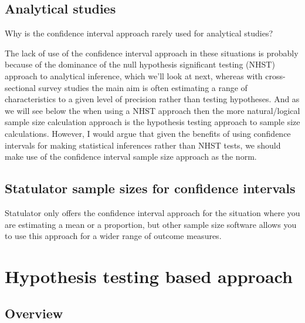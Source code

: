 \documentclass[
]{book}
\begin{document}
\hypertarget{analytical-studies}{%
\subsection{Analytical studies}\label{analytical-studies}}

Why is the confidence interval approach rarely used for analytical studies?

The lack of use of the confidence interval approach in these situations is probably because of the dominance of the null hypothesis significant testing (NHST) approach to analytical inference, which we'll look at next, whereas with cross-sectional survey studies the main aim is often estimating a range of characteristics to a given level of precision rather than testing hypotheses. And as we will see below the when using a NHST approach then the more natural/logical sample size calculation approach is the hypothesis testing approach to sample size calculations. However, I would argue that given the benefits of using confidence intervals for making statistical inferences rather than NHST tests, we should make use of the confidence interval sample size approach as the norm.

\hypertarget{statulator-sample-sizes-for-confidence-intervals}{%
\subsection{Statulator sample sizes for confidence intervals}\label{statulator-sample-sizes-for-confidence-intervals}}

Statulator only offers the confidence interval approach for the situation where you are estimating a mean or a proportion, but other sample size software allows you to use this approach for a wider range of outcome measures.

\hypertarget{hypothesis-testing-based-approach}{%
\section{Hypothesis testing based approach}\label{hypothesis-testing-based-approach}}

\hypertarget{overview-6}{%
\subsection{Overview}\label{overview-6}}
\end{document}
